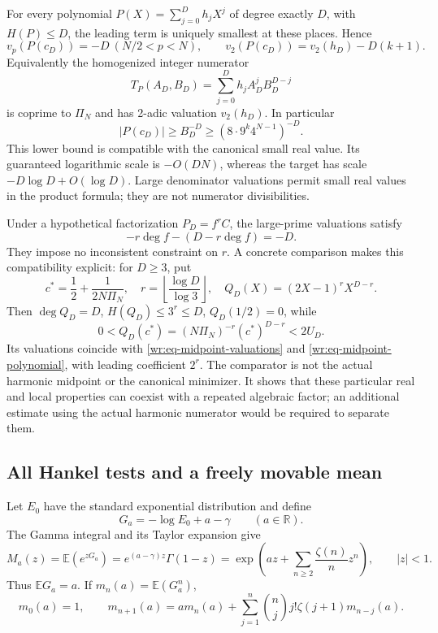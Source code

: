 \documentclass[11pt,a4paper]{article}
\newcommand{\R}{\mathbb R}
\theoremstyle{definition}
\theoremstyle{remark}
\numberwithin{equation}{section}
\begin{document}
For every polynomial \(P(X)=\sum_{j=0}^D h_jX^j\) of degree exactly
\(D\), with \(H(P)\le D\), the leading term is uniquely smallest at
these places. Hence
\begin{equation}\label{wr:eq-midpoint-polynomial}
 v_p(P(c_D))=-D\ (N/2<p<N),\qquad
 v_2(P(c_D))=v_2(h_D)-D(k+1).
\end{equation}
Equivalently the homogenized integer numerator
\[
 T_P(A_D,B_D)=\sum_{j=0}^D h_jA_D^jB_D^{D-j}
\]
is coprime to \(\Pi_N\) and has 2-adic valuation \(v_2(h_D)\).
In particular
\[
 |P(c_D)|\ge B_D^{-D}\ge(8\cdot9^k4^{N-1})^{-D}.
\]
This lower bound is compatible with the canonical small real value.
Its guaranteed logarithmic scale is \(-O(DN)\), whereas the target
has scale \(-D\log D+O(\log D)\). Large denominator valuations permit
small real values in the product formula; they are not numerator
divisibilities.

Under a hypothetical factorization \(P_D=f^rC\), the large-prime
valuations satisfy
\[
 -r\deg f-(D-r\deg f)=-D.
\]
They impose no inconsistent constraint on \(r\). A concrete comparison makes this compatibility explicit:
for \(D\ge3\), put
\[
 c^*=\frac12+\frac1{2N\Pi_N},\quad
 r=\left\lfloor\frac{\log D}{\log3}\right\rfloor,\quad
 Q_D(X)=(2X-1)^rX^{D-r}.
\]
Then \(\deg Q_D=D\), \(H(Q_D)\le3^r\le D\),
\(Q_D(1/2)=0\), while
\[
 0<Q_D(c^*)=(N\Pi_N)^{-r}(c^*)^{D-r}<2U_D.
\]
Its valuations coincide with \eqref{wr:eq-midpoint-valuations} and
\eqref{wr:eq-midpoint-polynomial}, with leading coefficient \(2^r\).
The comparator is not the actual harmonic midpoint or the canonical
minimizer. It shows that these particular real and local properties
can coexist with a repeated algebraic factor; an additional estimate
using the actual harmonic numerator would be required to separate them.

\subsection{All Hankel tests and a freely movable mean}

Let \(E_0\) have the standard exponential distribution and define
\[
 G_a=-\log E_0+a-\gamma\qquad(a\in\R).
\]
The Gamma integral and its Taylor expansion \cite{wr:dlmf} give
\begin{equation}\label{wr:eq-gumbel-mgf}
 M_a(z)=\mathbb E(e^{zG_a})
 =e^{(a-\gamma)z}\Gamma(1-z)
 =\exp\left(az+\sum_{n\ge2}\frac{\zeta(n)}n z^n\right),
 \qquad |z|<1.
\end{equation}
Thus \(\mathbb E G_a=a\). If \(m_n(a)=\mathbb E(G_a^n)\),
\begin{equation}\label{wr:eq-moment-recurrence}
 m_0(a)=1,\qquad
 m_{n+1}(a)=a m_n(a)+
 \sum_{j=1}^n\binom nj j!\zeta(j+1)m_{n-j}(a).
\end{equation}
\end{document}
